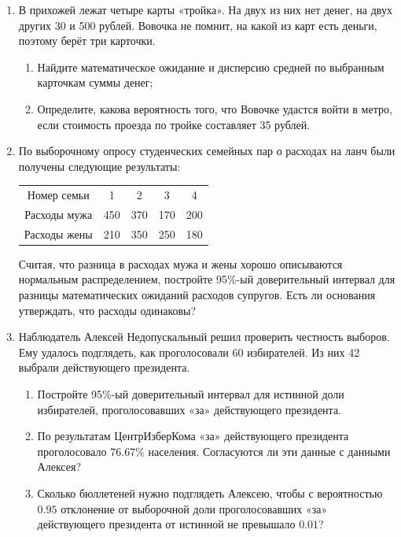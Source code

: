 \begin{enumerate}[resume]
\item В прихожей лежат четыре карты «тройка». На двух из них нет денег, на двух
других 30 и 500 рублей. Вовочка не помнит, на какой из карт есть деньги, поэтому
берёт три карточки.

\begin{enumerate}
\item Найдите математическое ожидание и дисперсию средней по выбранным карточкам
суммы денег;
\item Определите, какова вероятность того, что Вовочке удастся войти в метро,
если стоимость проезда по тройке составляет 35 рублей.
\end{enumerate}

\item По выборочному опросу студенческих семейных пар о расходах на ланч были
получены следующие результаты:

\begin{center}
\begin{tabular}{ccccc}
\toprule
Номер семьи & 1 & 2 & 3 & 4\\
Расходы мужа & 450 & 370 & 170 & 200\\
Расходы жены & 210 & 350 & 250 & 180\\
\bottomrule
\end{tabular}
\end{center}

Считая, что разница в расходах мужа и жены хорошо описываются нормальным распределением,
постройте 95\%-ый доверительный интервал для разницы математических ожиданий расходов
супругов. Есть ли основания утверждать, что расходы одинаковы?

\item Наблюдатель Алексей Недопускальный решил проверить честность выборов.
Ему удалось подглядеть, как проголосовали 60 избирателей. Из них 42 выбрали
действующего президента.

\begin{enumerate}
\item Постройте 95\%-ый доверительный интервал для истинной доли избирателей,
проголосовавших «за» действующего президента.
\item По результатам ЦентрИзберКома «за» действующего президента проголосовало
76.67\% населения. Согласуются ли эти данные с данными Алексея?
\item Сколько бюллетеней нужно подглядеть Алексею, чтобы с вероятностью
$0.95$ отклонение от выборочной доли проголосовавших «за» действующего
президента от истинной не превышало $0.01$?
\end{enumerate}
\end{enumerate}



